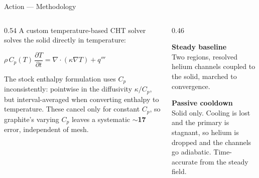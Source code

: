 \documentclass[aspectratio=169, 11pt, t]{beamer}
\newcommand{\hot}[1]{\textcolor{RadHot}{\textbf{#1}}}
\begin{document}
\begin{frame}{Action --- Methodology}
\begin{columns}[T]
\begin{column}{0.54\textwidth}
A custom temperature-based CHT solver solves the solid directly in temperature:
\vspace{3pt}
\begin{tcolorbox}[navybox]
\centering
$\rho\,C_p(T)\,\dfrac{\partial T}{\partial t} = \nabla\!\cdot\!(\kappa\nabla T) + q'''$
\end{tcolorbox}
\vspace{4pt}
{\footnotesize The stock enthalpy formulation uses $C_p$ inconsistently: pointwise in the diffusivity $\kappa/C_p$, but interval-averaged when converting enthalpy to temperature. These cancel only for constant $C_p$, so graphite's varying $C_p$ leaves a systematic \hot{$\sim$17\,\textcelsius} error, independent of mesh.}
\end{column}
\begin{column}{0.46\textwidth}
\begin{tcolorbox}[tealbox]
{\color{RadTeal}\bfseries Steady baseline}\\[1pt]
\footnotesize Two regions, resolved helium channels coupled to the solid, marched to convergence.
\end{tcolorbox}
\vspace{5pt}
\begin{tcolorbox}[amberbox]
{\color{RadAmberD}\bfseries Passive cooldown}\\[1pt]
\footnotesize Solid only. Cooling is lost and the primary is stagnant, so helium is dropped and the channels go adiabatic. Time-accurate from the steady field.
\end{tcolorbox}
\end{column}
\end{columns}
\end{frame}
\end{document}
